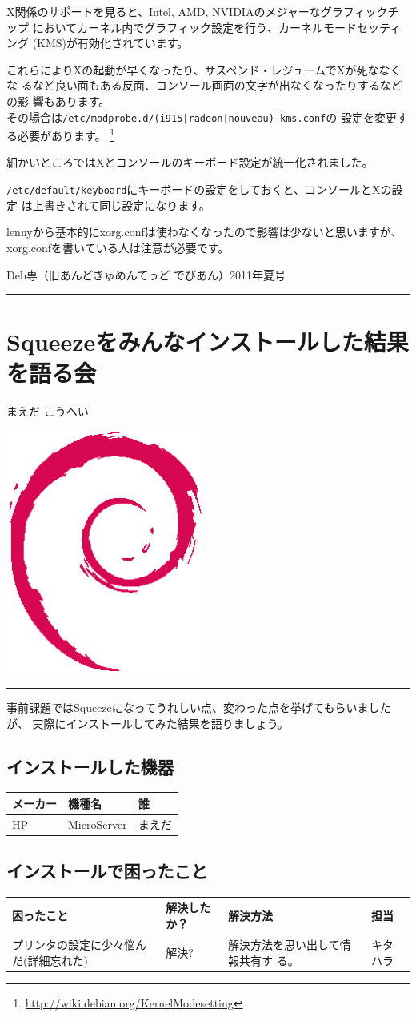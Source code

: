 \documentclass[mingoth,a4paper]{jsarticle}
\renewcommand{\dancersection}[2]{%
\newpage
Deb専（旧あんどきゅめんてっど でびあん）2011年夏号
%
\vspace{0.1mm}\\
{\color{dancerdarkblue}\rule{\hsize}{2mm}}

%
%
\begin{minipage}[t]{0.6\hsize}
\color{dancerdarkblue}
\vspace{1cm}
\section{#1}
\hfill{}#2\\
\end{minipage}
\begin{minipage}[t]{0.4\hsize}
\vspace{-2cm}
\hfill{}\includegraphics[height=8cm]{image200502/openlogo-nd.eps}\\
\vspace{-5cm}
\end{minipage}
%
{\color{dancerlightblue}\rule{0.66\hsize}{2mm}}
%
\vspace{2cm}
}
\begin{document}
X関係のサポートを見ると、Intel, AMD, NVIDIAのメジャーなグラフィックチップ
においてカーネル内でグラフィック設定を行う、カーネルモードセッティング
(KMS)が有効化されています。

これらによりXの起動が早くなったり、サスペンド・レジュームでXが死ななくな
るなど良い面もある反面、コンソール画面の文字が出なくなったりするなどの影
響もあります。\\
その場合は\texttt{/etc/modprobe.d/(i915|radeon|nouveau)-kms.conf}の
設定を変更する必要があります。
\footnote{\url{http://wiki.debian.org/KernelModesetting}}

細かいところではXとコンソールのキーボード設定が統一化されました。

\texttt{/etc/default/keyboard}にキーボードの設定をしておくと、コンソールとXの設定
は上書きされて同じ設定になります。

lennyから基本的にxorg.confは使わなくなったので影響は少ないと思いますが、
xorg.confを書いている人は注意が必要です。

\dancersection{Squeezeをみんなインストールした結果を語る会}{まえだ こうへい}

事前課題ではSqueezeになってうれしい点、変わった点を挙げてもらいましたが、
実際にインストールしてみた結果を語りましょう。

\subsection{インストールした機器}

\begin{table}[H]
 \begin{center}
  \begin{tabular}{|p{10em}|p{15em}|p{15em}|}
   \hline
   メーカー & 機種名 & 誰 \\
   \hline
   HP & MicroServer & まえだ\\
   \hline
  \end{tabular}
 \end{center}
\end{table}

\subsection{インストールで困ったこと}

\begin{table}[H]
 \begin{center}
  \begin{tabular}{|p{15em}|p{10em}|p{15em}|p{5em}|}
   \hline
   困ったこと & 解決したか？ & 解決方法 & 担当 \\
   \hline
   プリンタの設定に少々悩んだ(詳細忘れた)& 解決? & 解決方法を思い出して情報共有す
	   る。 & キタハラ\\
   \hline
  \end{tabular}
 \end{center}
\end{table}
\end{document}
